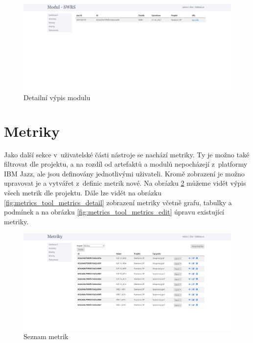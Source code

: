 \documentclass[czech,master]{diploma}
\begin{document}
\begin{figure}[!ht]
    \centering
    \includegraphics[width=1\textwidth]{Diplomka/Figures/metrics_tool/modules_detail.jpg}
    \caption{Detailní výpis modulu}
    \label{fig:metrics_tool_modules_detail}
\end{figure}

\newpage

\section{Metriky}

Jako další sekce v~uživatelské části nástroje se nachází metriky. Ty je možno také filtrovat dle projektu, a na rozdíl od artefaktů a modulů nepocházejí z~platformy IBM Jazz, ale jsou definovány jednotlivými uživateli. Kromě zobrazení je možno upravovat je a vytvářet z~definic metrik nové. Na obrázku \ref{fig:metrics_tool_metrics} můžeme vidět výpis všech metrik dle projektu. Dále lze vidět na obrázku \ref{fig:metrics_tool_metrics_detail} zobrazení metriky včetně grafu, tabulky a podmínek a na obrázku \ref{fig:metrics_tool_metrics_edit} úpravu existující metriky.

\begin{figure}[!ht]
    \centering
    \includegraphics[width=1\textwidth]{Diplomka/Figures/metrics_tool/metrics.jpg}
    \caption{Seznam metrik}
    \label{fig:metrics_tool_metrics}
\end{figure}
\end{document}
